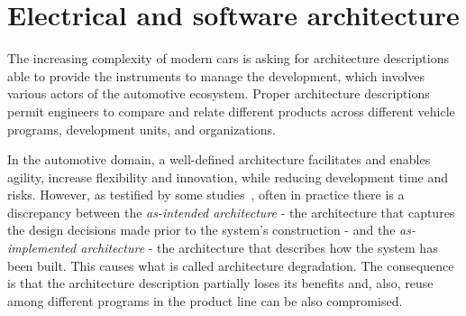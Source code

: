\section{Electrical and software architecture}\label{sec:architecture}


The increasing complexity of modern cars is asking for architecture descriptions able to provide the instruments to manage the development, which involves various actors of the automotive ecosystem. Proper architecture descriptions permit engineers to compare and relate different products across different vehicle programs, development units, and organizations. 

In the automotive domain, a well-defined architecture facilitates and enables agility, increase flexibility and innovation, while reducing development time and risks. However, as testified by some studies~\cite{Models2016,WICSA2015,JSA2017},
often in practice there is a discrepancy between the {\em as-intended architecture} - the architecture that captures the design decisions made
prior to the system's construction - and the {\em as-implemented 
architecture} - the architecture that describes how
the system has been built. This causes what is called architecture degradation. The consequence is that the architecture description partially loses its benefits and, also, reuse among different programs in the product line can be also compromised. 




